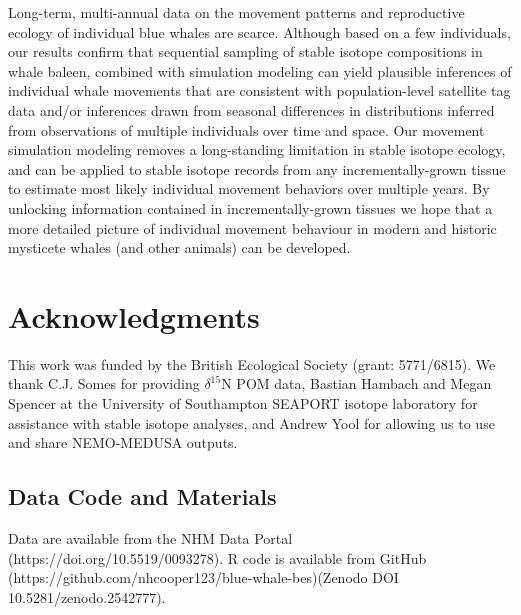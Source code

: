 \documentclass[a4paper,12pt]{article}
\begin{document}
Long-term, multi-annual data on the movement patterns and reproductive ecology of individual blue whales are scarce. 
Although based on a few individuals, our results confirm that sequential sampling of stable isotope compositions in whale baleen, combined with simulation modeling can yield plausible inferences of individual whale movements that are consistent with population-level satellite tag data and/or inferences drawn from seasonal differences in distributions inferred from observations of multiple individuals over time and space. 
Our movement simulation modeling removes a long-standing limitation in stable isotope ecology, and can be applied to stable isotope records from any incrementally-grown tissue to estimate most likely individual movement behaviors over multiple years. 
By unlocking information contained in incrementally-grown tissues we hope that a more detailed picture of individual movement behaviour in modern and historic mysticete whales (and other animals) can be developed.

\section{Acknowledgments}\label{acknowledgments}
This work was funded by the British Ecological Society (grant: 5771/6815). 
We thank C.J. Somes for providing  $\delta^{15}$N POM data, Bastian Hambach and Megan Spencer at the University of Southampton SEAPORT isotope laboratory for assistance with stable isotope analyses, and Andrew Yool for allowing us to use and share NEMO-MEDUSA outputs.


%


\subsection{Data Code and Materials}\label{data-code-and-materials}
Data are available from the NHM Data Portal (https://doi.org/10.5519/0093278). 
R code is available from GitHub (https://github.com/nhcooper123/blue-whale-bes)(Zenodo DOI 10.5281/zenodo.2542777).
\end{document}
